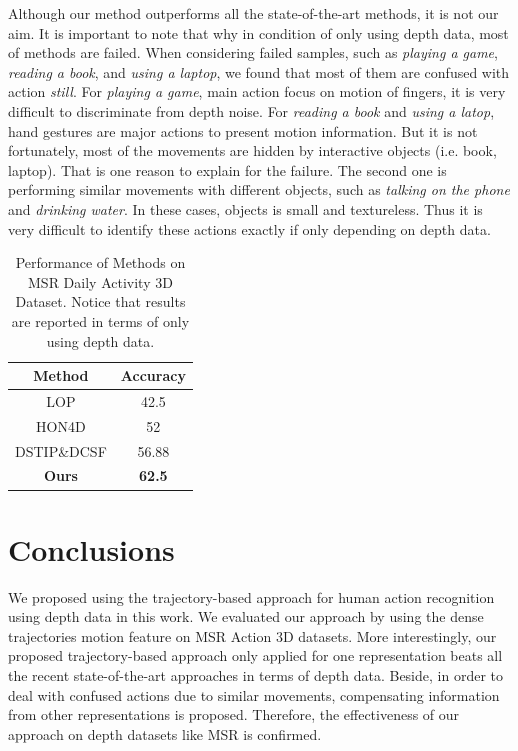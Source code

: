 \documentclass[review]{elsarticle}
\begin{document}
Although our method outperforms all the state-of-the-art methods, it is not our aim. It is important to note that why in condition of only using depth data, most of methods are failed. When considering failed samples, such as \textit{playing a game}, \textit{reading a book}, and \textit{using a laptop}, we found that most of them are confused with action \textit{still}. For \textit{playing a game}, main action focus on motion of fingers, it is very difficult to discriminate from depth noise. For \textit{reading a book} and \textit{using a latop}, hand gestures are major actions to present motion information. But it is not fortunately, most of the movements are hidden by interactive objects (i.e. book, laptop). That is one reason to explain for the failure. The second one is performing similar movements with different objects, such as \textit{talking on the phone} and \textit{drinking water}. In these cases, objects is small and textureless. Thus it is very difficult to identify these actions exactly if only depending on depth data.

\begin{table}[H]
	\begin{center}
		\begin{tabular}{c|c}
		
		{\bf Method} & {\bf Accuracy} \\
		\hline
		       LOP \cite{wang2012mining} &       42.5 \\
		
		     HON4D \cite{oreifej2013hon4d} &         52 \\
		
		DSTIP\&DCSF \cite{xia2013spatio} &      56.88 \\
		\hline
		{\bf Ours} & {\bf 62.5} \\
		
		\end{tabular}
	\end{center}
	\caption{\label{lbl:Table_Daily3D}Performance of Methods on MSR Daily Activity 3D Dataset. Notice that results are reported in terms of only using depth data.}
\end{table}

\section{Conclusions}

We proposed using the trajectory-based approach for human action recognition using depth data in this work. We evaluated our approach by using the dense trajectories motion feature on MSR Action 3D datasets. More interestingly, our proposed trajectory-based approach only applied for one representation beats all the recent state-of-the-art approaches in terms of depth data. Beside, in order to deal with confused actions due to similar movements, compensating information from other representations is proposed. Therefore, the effectiveness of our approach on depth datasets like MSR is confirmed.
\end{document}
